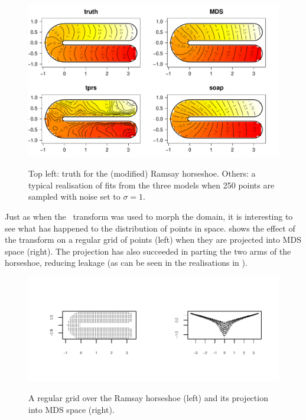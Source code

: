 {%
\begin{figure}
\centering
\includegraphics[width=6in]{mds/figs/ramsay-fit-1.pdf} \\
\caption{Top left: truth for the (modified) Ramsay horseshoe. Others: a typical realisation of fits from the three models when 250 points are sampled with noise set to $\sigma=1$.}
\label{mds-ramsay-fit-1}
\end{figure}

Just as when the \sch\ transform was used to morph the domain, it is interesting to see what has happened to the distribution of points in space.  shows the effect of the transform on a regular grid of points (left) when they are projected into MDS space (right). The projection has also succeeded in parting the two arms of the horseshoe, reducing leakage (as can be seen in the realisations in ).

\begin{figure}
\centering
\includegraphics[width=6in,trim=0.5in 0.5in 0in 0.5in]{mds/figs/mdsrampoints.pdf} \\
\caption{A regular grid over the Ramsay horseshoe (left) and its projection into MDS space (right).}
\label{mdsrampoints}
\end{figure}


}
